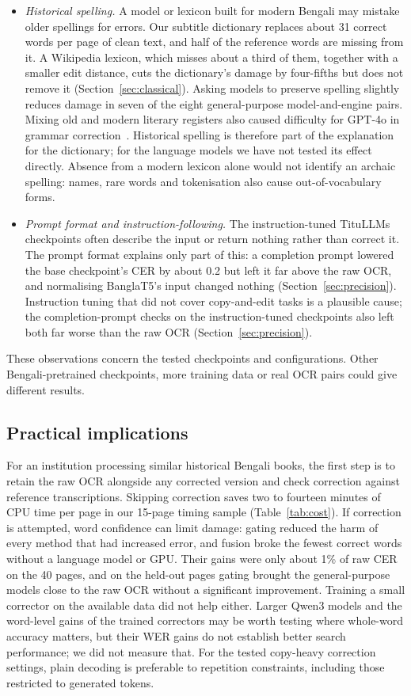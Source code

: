 \documentclass[conference]{IEEEtran}
\begin{document}
\begin{itemize}
\item \emph{Historical spelling.} A model or lexicon built for modern Bengali may mistake older spellings for errors. Our subtitle dictionary replaces about 31 correct words per page of clean text, and half of the reference words are missing from it. A Wikipedia lexicon, which misses about a third of them, together with a smaller edit distance, cuts the dictionary's damage by four-fifths but does not remove it (Section~\ref{sec:classical}). Asking models to preserve spelling slightly reduces damage in seven of the eight general-purpose model-and-engine pairs. Mixing old and modern literary registers also caused difficulty for GPT-4o in grammar correction~\cite{bhattacharyya2025banglagec}. Historical spelling is therefore part of the explanation for the dictionary; for the language models we have not tested its effect directly. Absence from a modern lexicon alone would not identify an archaic spelling: names, rare words and tokenisation also cause out-of-vocabulary forms.
\item \emph{Prompt format and instruction-following.} The instruction-tuned TituLLMs checkpoints often describe the input or return nothing rather than correct it. The prompt format explains only part of this: a completion prompt lowered the base checkpoint's CER by about 0.2 but left it far above the raw OCR, and normalising BanglaT5's input changed nothing (Section~\ref{sec:precision}). Instruction tuning that did not cover copy-and-edit tasks is a plausible cause; the completion-prompt checks on the instruction-tuned checkpoints also left both far worse than the raw OCR (Section~\ref{sec:precision}).
\end{itemize}
These observations concern the tested checkpoints and configurations. Other Bengali-pretrained checkpoints, more training data or real OCR pairs could give different results.

\subsection{Practical implications}
For an institution processing similar historical Bengali books, the first step is to retain the raw OCR alongside any corrected version and check correction against reference transcriptions. Skipping correction saves two to fourteen minutes of CPU time per page in our 15-page timing sample (Table~\ref{tab:cost}). If correction is attempted, word confidence can limit damage: gating reduced the harm of every method that had increased error, and fusion broke the fewest correct words without a language model or GPU. Their gains were only about 1\% of raw CER on the 40 pages, and on the held-out pages gating brought the general-purpose models close to the raw OCR without a significant improvement. Training a small corrector on the available data did not help either. Larger Qwen3 models and the word-level gains of the trained correctors may be worth testing where whole-word accuracy matters, but their WER gains do not establish better search performance; we did not measure that. For the tested copy-heavy correction settings, plain decoding is preferable to repetition constraints, including those restricted to generated tokens.
\end{document}
